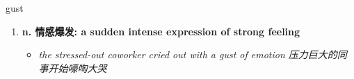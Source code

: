 
\begin{frame}
{\huge gust}
\begin{center}
\begin{enumerate}\Large
  \item \textbf{n. 情感爆发: a sudden intense expression of strong feeling}
  \begin{itemize}
    \item \em{\Large{the stressed-out coworker cried out with a gust of emotion 压力巨大的同事开始嚎啕大哭}}
  \end{itemize}
\end{enumerate}
\end{center}
\end{frame}

